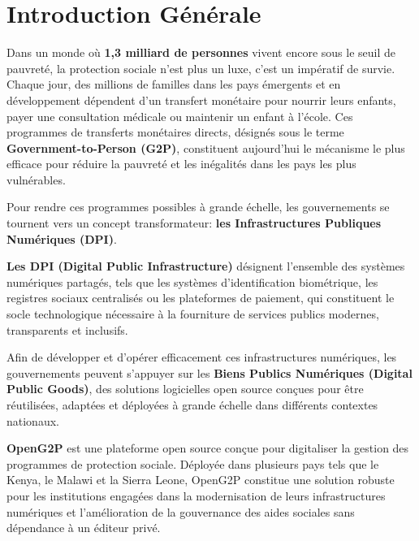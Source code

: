 \documentclass[a4paper, oneside, 12pt]{book}
\begin{document}
       \mainmatter %
       \chapter*{Introduction Générale}  
       
\hspace{0.5cm}Dans un monde où \textbf{1,3 milliard de personnes} vivent encore sous le seuil de pauvreté\cite{BM_PovertyData2023}, la protection sociale n'est plus un luxe, c'est un impératif de survie. Chaque jour, des millions de familles dans les pays émergents et en développement dépendent d'un transfert monétaire pour nourrir leurs enfants, payer une consultation médicale ou maintenir un enfant à l'école. Ces programmes de transferts monétaires directs, désignés sous le terme \textbf{Government-to-Person (G2P)}, constituent aujourd'hui le mécanisme le plus efficace pour réduire la pauvreté et les inégalités dans les pays les plus vulnérables.

\hspace{0.5cm}Pour rendre ces programmes possibles à grande échelle, les gouvernements se tournent vers un concept transformateur: \textbf{les Infrastructures Publiques Numériques (DPI)}. 

\hspace{0.5cm}\textbf{Les DPI (Digital Public Infrastructure)} désignent l'ensemble des systèmes numériques partagés, tels que les systèmes d'identification biométrique, les registres sociaux centralisés ou les plateformes de paiement, qui constituent le socle technologique nécessaire à la fourniture de services publics modernes, transparents et inclusifs.

\hspace{0.5cm}Afin de développer et d'opérer efficacement ces infrastructures numériques, les gouvernements peuvent s'appuyer sur les \textbf{Biens Publics Numériques (Digital Public Goods)}, des solutions logicielles open source conçues pour être réutilisées, adaptées et déployées à grande échelle dans différents contextes nationaux.

\hspace{0.5cm}\textbf{OpenG2P} est une plateforme open source conçue pour digitaliser la gestion des programmes de protection sociale. Déployée dans plusieurs pays tels que le Kenya, le Malawi et la Sierra Leone, OpenG2P constitue une solution robuste pour les institutions engagées dans la modernisation de leurs infrastructures numériques et l'amélioration de la gouvernance des aides sociales sans dépendance à un éditeur privé.
\end{document}
